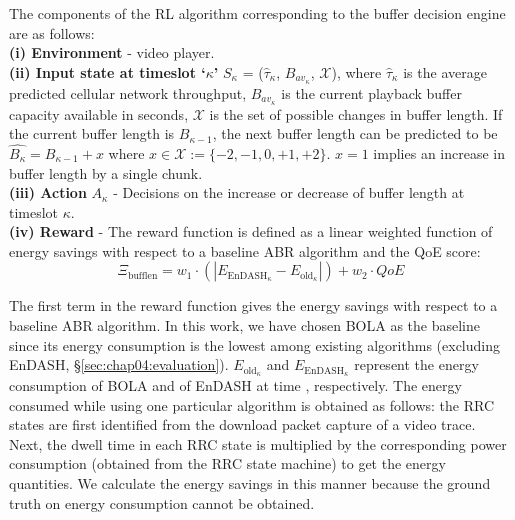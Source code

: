 \indent The components of the \ac{RL} algorithm corresponding to the buffer decision engine are as follows:\\
\noindent \textbf{(i) Environment}   - video player.\\
\noindent \textbf{(ii) Input state at timeslot `$\kappa$'} $S_\kappa$ =  ($\hat{\tau}_{{\kappa}}$, $B_{av_\kappa}$, ${\mathcal{X}}$), where
  $\hat{\tau}_{{\kappa}}$ is the  average predicted cellular network throughput,
 $B_{av_\kappa}$ is the current playback buffer capacity available in seconds,
$\mathcal{X}$ is the set of possible changes in buffer length. If the current buffer length is $B_{\kappa-1}$, the next buffer length can be predicted to be $\hat{B_\kappa}= B_{\kappa-1}+x$ where $x\in\mathcal{X}:=\{-2,-1,0,+1,+2\}$. $x=1$ implies an increase in buffer length by a single chunk.\\
\noindent \textbf{(iii) Action} $A_\kappa$ - Decisions on the increase or decrease of buffer length at timeslot $\kappa$. \\
\noindent \textbf{(iv) Reward} - The reward function is defined as a linear weighted function of energy savings with respect to a baseline \ac{ABR} algorithm and the \ac{QoE} score:
    \begin{equation}
    \Xi_{\mathrm{bufflen}} = w_1 \cdot (\left|E_{\mathrm{EnDASH}_\kappa}-E_{\mathrm{old}_\kappa}\right|)+w_2 \cdot QoE
    \end{equation}

\indent The first term in the reward function gives the energy savings with respect to a baseline \ac{ABR} algorithm. In this work, we have chosen BOLA \cite{Spiteri2016} as the baseline since its energy consumption is the lowest among existing algorithms (excluding EnDASH, \S{\ref{sec:chap04:evaluation}}).  $E_{\mathrm{old}_\kappa}$ and $E_{\mathrm{EnDASH}_\kappa}$ represent the energy consumption of BOLA and of EnDASH at time \mq{\kappa}, respectively. The energy consumed while using one particular algorithm is obtained as follows:  the \ac{RRC} states are first identified from the download packet capture of a video trace. Next, the dwell time in each \ac{RRC} state is multiplied by the corresponding power consumption (obtained from the \ac{RRC} state machine) to get the energy quantities. We calculate the energy savings in this manner because the ground truth on energy consumption cannot be obtained.

